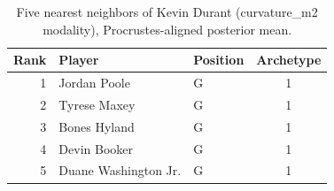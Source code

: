 \begin{table}[htbp]
  \centering\small
  \begin{tabular}{rllc}
    \toprule
    Rank & Player & Position & Archetype \\
    \midrule
    1 & Jordan Poole & G & 1 \\
    2 & Tyrese Maxey & G & 1 \\
    3 & Bones Hyland & G & 1 \\
    4 & Devin Booker & G & 1 \\
    5 & Duane Washington Jr. & G & 1 \\
    \bottomrule
  \end{tabular}
  \caption{Five nearest neighbors of Kevin Durant (curvature_m2 modality), Procrustes-aligned posterior mean.}
  \label{tab:Kevin_Durant_neighbors_curvature_m2}
\end{table}

